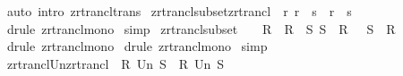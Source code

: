 \begin{isabellebody}
%
\isadelimproof
%
\endisadelimproof
%
\isatagproof
{}\isamarkupfalse%
\ {\isacharparenleft}auto\ intro{\isacharcolon}\ zrtrancl{\isacharunderscore}trans{\isacharparenright}\isanewline
{}\isamarkupfalse%
%
\endisatagproof
{\isafoldproof}%
%
\isadelimproof
\isanewline
%
\endisadelimproof
\isanewline
{}\isamarkupfalse%
\ zrtrancl{\isacharunderscore}subset{\isacharunderscore}zrtrancl\ {\isacharcolon}\ {\isachardoublequoteopen}{\isacharbang}{\isacharbang}r{\isachardot}\ r\ {\isacharless}{\isacharequal}\ s{\isacharpercent}{\isacharasterisk}\ {\isacharequal}{\isacharequal}{\isachargreater}\ r{\isacharpercent}{\isacharasterisk}\ {\isacharless}{\isacharequal}\ s{\isacharpercent}{\isacharasterisk}{\isachardoublequoteclose}\isanewline
%
\isadelimproof
%
\endisadelimproof
%
\isatagproof
{}\isamarkupfalse%
\ {\isacharparenleft}drule\ zrtrancl{\isacharunderscore}mono{\isacharparenright}\isanewline
{}\isamarkupfalse%
\ simp\isanewline
{}\isamarkupfalse%
%
\endisatagproof
{\isafoldproof}%
%
\isadelimproof
\isanewline
%
\endisadelimproof
\isanewline
{}\isamarkupfalse%
\ zrtrancl{\isacharunderscore}subset\ {\isacharcolon}\ \ {\isachardoublequoteopen}{\isacharbang}{\isacharbang}\ R{\isachardot}\ {\isacharbrackleft}{\isacharbar}\ R\ {\isacharless}{\isacharequal}\ S{\isacharsemicolon}\ S\ {\isacharless}{\isacharequal}\ R{\isacharpercent}{\isacharasterisk}\ {\isacharbar}{\isacharbrackright}\ {\isacharequal}{\isacharequal}{\isachargreater}\ S{\isacharpercent}{\isacharasterisk}\ {\isacharequal}\ R{\isacharpercent}{\isacharasterisk}{\isachardoublequoteclose}\isanewline
%
\isadelimproof
%
\endisadelimproof
%
\isatagproof
{}\isamarkupfalse%
\ {\isacharparenleft}drule\ zrtrancl{\isacharunderscore}mono{\isacharparenright}\isanewline
{}\isamarkupfalse%
\ {\isacharparenleft}drule\ zrtrancl{\isacharunderscore}mono{\isacharparenright}\isanewline
{}\isamarkupfalse%
\ simp\isanewline
{}\isamarkupfalse%
%
\endisatagproof
{\isafoldproof}%
%
\isadelimproof
\isanewline
%
\endisadelimproof
\isanewline
{}\isamarkupfalse%
\ zrtrancl{\isacharunderscore}Un{\isacharunderscore}zrtrancl\ {\isacharcolon}\ {\isachardoublequoteopen}{\isacharparenleft}R{\isacharpercent}{\isacharasterisk}\ Un\ S{\isacharpercent}{\isacharasterisk}{\isacharparenright}{\isacharpercent}{\isacharasterisk}\ {\isacharequal}\ {\isacharparenleft}R\ Un\ S{\isacharparenright}{\isacharpercent}{\isacharasterisk}{\isachardoublequoteclose}\isanewline

\end{isabellebody}
